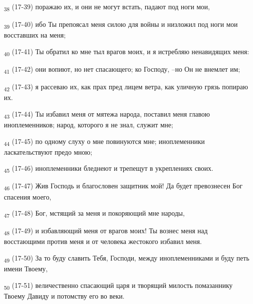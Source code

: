 \begin{tcolorbox}
\textsubscript{38} (17-39) поражаю их, и они не могут встать, падают под ноги мои,
\end{tcolorbox}
\begin{tcolorbox}
\textsubscript{39} (17-40) ибо Ты препоясал меня силою для войны и низложил под ноги мои восставших на меня;
\end{tcolorbox}
\begin{tcolorbox}
\textsubscript{40} (17-41) Ты обратил ко мне тыл врагов моих, и я истребляю ненавидящих меня:
\end{tcolorbox}
\begin{tcolorbox}
\textsubscript{41} (17-42) они вопиют, но нет спасающего; ко Господу, --но Он не внемлет им;
\end{tcolorbox}
\begin{tcolorbox}
\textsubscript{42} (17-43) я рассеваю их, как прах пред лицем ветра, как уличную грязь попираю их.
\end{tcolorbox}
\begin{tcolorbox}
\textsubscript{43} (17-44) Ты избавил меня от мятежа народа, поставил меня главою иноплеменников; народ, которого я не знал, служит мне;
\end{tcolorbox}
\begin{tcolorbox}
\textsubscript{44} (17-45) по одному слуху о мне повинуются мне; иноплеменники ласкательствуют предо мною;
\end{tcolorbox}
\begin{tcolorbox}
\textsubscript{45} (17-46) иноплеменники бледнеют и трепещут в укреплениях своих.
\end{tcolorbox}
\begin{tcolorbox}
\textsubscript{46} (17-47) Жив Господь и благословен защитник мой! Да будет превознесен Бог спасения моего,
\end{tcolorbox}
\begin{tcolorbox}
\textsubscript{47} (17-48) Бог, мстящий за меня и покоряющий мне народы,
\end{tcolorbox}
\begin{tcolorbox}
\textsubscript{48} (17-49) и избавляющий меня от врагов моих! Ты вознес меня над восстающими против меня и от человека жестокого избавил меня.
\end{tcolorbox}
\begin{tcolorbox}
\textsubscript{49} (17-50) За то буду славить Тебя, Господи, между иноплеменниками и буду петь имени Твоему,
\end{tcolorbox}
\begin{tcolorbox}
\textsubscript{50} (17-51) величественно спасающий царя и творящий милость помазаннику Твоему Давиду и потомству его во веки.
\end{tcolorbox}
